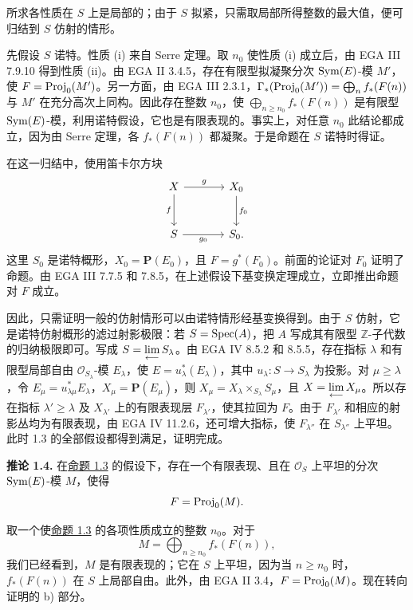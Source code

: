 所求各性质在 \(S\) 上是局部的；由于 \(S\) 拟紧，只需取局部所得整数的最大值，便可归结到 \(S\) 仿射的情形。

先假设 \(S\) 诺特。性质 (i) 来自 Serre 定理。取 \(n_0\) 使性质 (i) 成立后，由 EGA III 7.9.10 得到性质 (ii)。由 EGA II 3.4.5，存在有限型拟凝聚分次 \(\Sym(E)\)-模 \(M'\)，使 \(F=\Proj_0(M')\)。另一方面，由 EGA III 2.3.1，\(\Gamma_*(\Proj_0(M'))=\bigoplus_n f_*(F(n))\) 与 \(M'\) 在充分高次上同构。因此存在整数 \(n_0\)，使 \(\bigoplus_{n\ge n_0}f_*(F(n))\) 是有限型 \(\Sym(E)\)-模，利用诺特假设，它也是有限表现的。事实上，对任意 \(n_0\) 此结论都成立，因为由 Serre 定理，各 \(f_*(F(n))\) 都凝聚。于是命题在 \(S\) 诺特时得证。

在这一归结中，使用笛卡尔方块
\[
\begin{tikzcd}[column sep=large,row sep=large]
X \arrow[r,"g"] \arrow[d,"f"'] & X_0 \arrow[d,"f_0"]\\
S \arrow[r,"g_0"'] & S_0 .
\end{tikzcd}
\]
这里 \(S_0\) 是诺特概形，\(X_0=\mathbf P(E_0)\)，且 \(F=g^*(F_0)\)。前面的论证对 \(F_0\) 证明了命题。由 EGA III 7.7.5 和 7.8.5，在上述假设下基变换定理成立，立即推出命题对 \(F\) 成立。

因此，只需证明一般的仿射情形可以由诺特情形经基变换得到。由于 \(S\) 仿射，它是诺特仿射概形的滤过射影极限：若 \(S=\Spec(A)\)，把 \(A\) 写成其有限型 \(\mathbb Z\)-子代数的归纳极限即可。写成 \(S=\varprojlim S_\lambda\)。由 EGA IV 8.5.2 和 8.5.5，存在指标 \(\lambda\) 和有限型局部自由 \(\mathcal O_{S_\lambda}\)-模 \(E_\lambda\)，使 \(E=u_\lambda^*(E_\lambda)\)，其中 \(u_\lambda:S\to S_\lambda\) 为投影。对 \(\mu\ge\lambda\)，令 \(E_\mu=u_{\lambda\mu}^*E_\lambda\)，\(X_\mu=\mathbf P(E_\mu)\)，则 \(X_\mu=X_\lambda\times_{S_\lambda}S_\mu\)，且 \(X=\varprojlim X_\mu\)。所以存在指标 \(\lambda'\ge\lambda\) 及 \(X_{\lambda'}\) 上的有限表现层 \(F_{\lambda'}\)，使其拉回为 \(F\)。由于 \(F_{\lambda'}\) 和相应的射影丛均为有限表现，由 EGA IV 11.2.6，还可增大指标，使 \(F_{\lambda''}\) 在 \(S_{\lambda''}\) 上平坦。此时 1.3 的全部假设都得到满足，证明完成。

\textbf{推论 1.4.} 在\hyperlink{sga6.e06.prop.1-3}{命题 1.3} 的假设下，存在一个有限表现、且在 \(\mathcal O_S\) 上平坦的分次 \(\Sym(E)\)-模 \(M\)，使得
\[
  F=\Proj_0(M).
\]

取一个使\hyperlink{sga6.e06.prop.1-3}{命题 1.3} 的各项性质成立的整数 \(n_0\)。对于
\[
 M=\bigoplus_{n\ge n_0}f_*(F(n)),
\]
我们已经看到，\(M\) 是有限表现的；它在 \(S\) 上平坦，因为当 \(n\ge n_0\) 时，\(f_*(F(n))\) 在 \(S\) 上局部自由。此外，由 EGA II 3.4，\(F=\Proj_0(M)\)。现在转向证明的 b) 部分。

